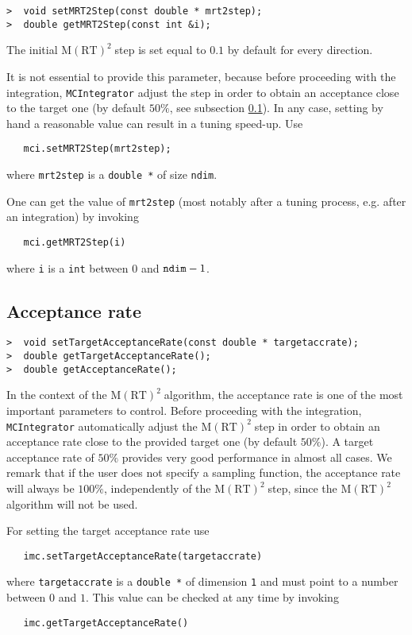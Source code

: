 \documentclass[11pt,a4paper,twoside]{article}
\newcommand{\MRTWO}{$ \text{M}(\text{RT})^2 \;$}
\begin{document}
\begin{verbatim}
>  void setMRT2Step(const double * mrt2step);
>  double getMRT2Step(const int &i);
\end{verbatim}

The initial \MRTWO step is set equal to $0.1$ by default for every direction.

It is not essential to provide this parameter, because before proceeding with the integration, \verb+MCIntegrator+ adjust the step in order to obtain an acceptance close to the target one (by default $50\%$, see subsection \ref{sub:acceptance_rate}).
In any case, setting by hand a reasonable value can result in a tuning speed-up.
Use
\begin{verbatim}
   mci.setMRT2Step(mrt2step);
\end{verbatim}
where \verb+mrt2step+ is a \verb+double *+ of size \verb+ndim+.

One can get the value of \verb+mrt2step+ (most notably after a tuning process, e.g. after an integration) by invoking
\begin{verbatim}
   mci.getMRT2Step(i)
\end{verbatim}
where \verb+i+ is a \verb+int+ between $0$ and $\verb+ndim+-1$.



\subsection{Acceptance rate} %
\label{sub:acceptance_rate}

\begin{verbatim}
>  void setTargetAcceptanceRate(const double * targetaccrate);
>  double getTargetAcceptanceRate();
>  double getAcceptanceRate();
\end{verbatim}

In the context of the \MRTWO algorithm, the acceptance rate is one of the most important parameters to control.
Before proceeding with the integration, \verb+MCIntegrator+ automatically adjust the \MRTWO step in order to obtain an acceptance rate close to the provided target one (by default $50\%$).
A target acceptance rate of $50\%$ provides very good performance in almost all cases.
We remark that if the user does not specify a sampling function, the acceptance rate will always be $100\%$, independently of the \MRTWO step, since the \MRTWO algorithm will not be used.

For setting the target acceptance rate use
\begin{verbatim}
   imc.setTargetAcceptanceRate(targetaccrate)
\end{verbatim}
where \verb+targetaccrate+ is a \verb+double *+ of dimension \verb+1+ and must point to a number between $0$ and $1$.
This value can be checked at any time by invoking
\begin{verbatim}
   imc.getTargetAcceptanceRate()
\end{verbatim}
\end{document}
